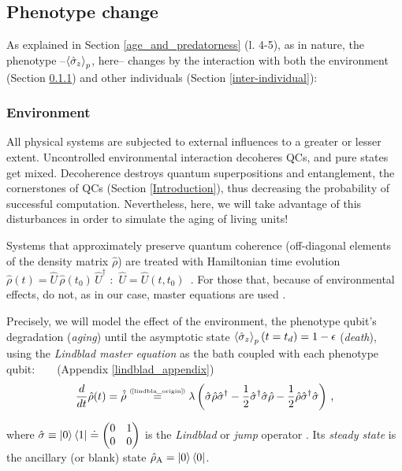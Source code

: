 \documentclass[11pt]{article}
\numberwithin{equation}{section} %
\numberwithin{figure}{section} %
\newcommand\numeq[1] %
  {\stackrel{\scriptscriptstyle(\mkern-1.5mu#1\mkern-1.5mu)}{=}}
\begin{document}
\subsection{Phenotype change}

As explained in Section \ref{age_and_predatorness} (l. 4-5), as in nature, the phenotype --$\braket{\hat{\sigma}_z}_p$, here-- changes by the interaction with both the environment (Section \ref{environment}) and other individuals (Section \ref{inter-individual}):

\subsubsection{Environment} \label{environment}

All physical systems are subjected to external influences to a greater or lesser extent. Uncontrolled environmental interaction decoheres QCs, and pure states get mixed. Decoherence destroys quantum superpositions and entanglement, the cornerstones of QCs (Section \ref{Introduction}), thus decreasing the probability of successful computation. Nevertheless, here, we will take advantage of this disturbances in order to simulate the aging of living units!

Systems that approximately preserve quantum coherence (off-diagonal elements of the density matrix $\hat{\rho}$) are treated with Hamiltonian time evolution $\hat{\rho}(t)=\hat{U}\,\hat{\rho}(t_0)\,\hat{U}^\dagger$ $:$ $\hat{U}=\hat{U}(t,t_0)$ $\,$\cite[p.~4604, Eq.~(8)]{DiVincenzo}. For those that, because of environmental effects, do not, as in our case, master equations are used \cite[p.~1074, l.~55-60]{Lloyd}.

 Precisely, we will model the effect of the environment, the phenotype qubit's degradation (\emph{aging}) until the asymptotic state $\braket{\hat{\sigma}_z}_p(t=t_d)=1-\epsilon$ (\emph{death}), using the \emph{Lindblad master equation} as the bath coupled with each phenotype qubit: $\,\,\,$ \cite[p.~2, Eq.~(2)]{AL_in_QT} $\,\,\,$ (Appendix \ref{lindblad_appendix})
\begin{equation} \label{lindblad_environ}
\frac{d}{dt}\hat{\rho}(t)=\hat{\dot{\rho}}\numeq{\textrm{\ref{lindbla_origin}}}\lambda\left(\hat{\sigma}\hat{\rho}\hat{\sigma}^\dagger - \frac{1}{2}\hat{\sigma}^\dagger \hat{\sigma}\hat{\rho}-\frac{1}{2}\hat{\rho}\hat{\sigma}^\dagger\hat{\sigma}\right)\,\textrm{,}
\end{equation}

where $\hat{\sigma}\equiv\ket{0}\bra{1}\doteq\begin{pmatrix}0&1\\0&0
\end{pmatrix}$ is the \emph{Lindblad} or \emph{jump} operator \cite[p.~2, l.~24-25]{QAL_IBM}. Its \emph{steady state} is the ancillary (or blank) state $\hat{\rho}_\textrm{A}=\ket{0}\bra{0}$. 
\end{document}
